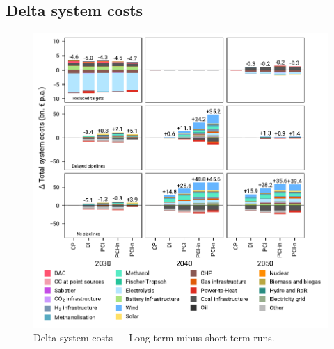 \documentclass[preprint,12pt,sort&compress]{elsarticle}
\begin{document}
\subsection{Delta system costs}
\begin{figure}[htbp]
  \centering
  \includegraphics[width=\textwidth]{costs_overview_extended.pdf}
  \caption{Delta system costs --- Long-term minus short-term runs.}
  \label{fig:costs_overview_extended}
\end{figure}

\clearpage
\end{document}

